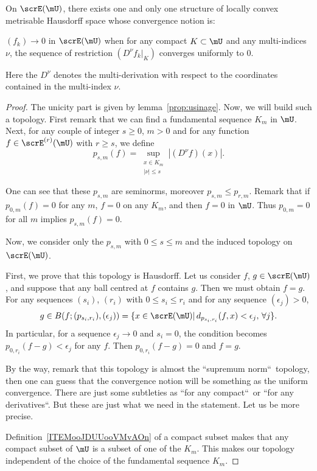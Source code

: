 \begin{proposition}
On $\scrE(\mU)$, there exists one and only one structure of locally convex metrisable Hausdorff space whose convergence notion is:

$(f_k)\to 0$ in $\scrE(\mU)$ when for any compact $K\subset\mU$ and any multi-indices $\nu$, the sequence of restriction $(D^{\nu}f_k|_K)$ converges uniformly to $0$.

Here the $D^{\nu}$ denotes the multi-derivation with respect to the coordinates contained in the multi-index $\nu$.
\label{prop:topo_E}
\end{proposition}
\begin{proof}
 The unicity part is given by lemma~\ref{prop:usinage}. Now, we will build such a topology. First remark that we can find a fundamental sequence $K_m$ in $\mU$. Next, for any couple of integer $s\geq 0$, $m>0$ and for any function $f\in\scrE^{(r)}(\mU)$ with $r\geq s$, we define
\[
   p_{s,m}(f)=\sup_{\substack{ x\in K_m\\|\nu|\leq s}}|(D^{\nu}f)(x)|.
\]

One can see that these $p_{s,m}$ are seminorms, moreover $p_{s,m}\leq p_{r,m}$. Remark that if $p_{0,m}(f)=0$ for any $m$, $f=0$ on any $K_m$, and then $f=0$ in $\mU$. Thus $p_{0,m}=0$ for all $m$ implies $p_{s,m}(f)=0$.

Now, we consider only the $p_{s,m}$ with $0\leq s\leq m$ and the induced topology on $\scrE(\mU)$.

First, we prove that this topology is Hausdorff. Let us consider $f$, $g\in\scrE(\mU)$, and suppose that any ball centred at $f$ contains $g$. Then we must obtain $f=g$. For any sequences $(s_i)$, $(r_i)$ with $0\leq s_i\leq r_i$ and for any sequence $(\epsilon_j)>0$,
\[
  g\in B(f;(p_{s_i,r_i}),(\epsilon_j))=
          \{ x\in\scrE(\mU)|\, d_{p_{s_i,r_i}}(f,x)<\epsilon_j,\,\forall j \}.
\]
In particular, for a sequence $\epsilon_j\to 0$ and $s_i=0$, the condition becomes $p_{0,r_i}(f-g)<\epsilon_j$ for any $f$. Then $p_{0,r_i}(f-g)=0$ and $f=g$.

By the way, remark that this topology is almost the ``supremum norm``\ topology, then one can guess that the convergence notion will be something as the uniform convergence. There are just some subtleties as ``for any compact``\ or ``for any derivatives``. But these are just what we need in the statement. Let us be more precise.

Definition~\ref{ITEMooJDUUooVMvAOn} of a compact subset makes that any compact subset of $\mU$ is a subset of one of the $K_m$. This makes our topology independent of the choice of the fundamental sequence $K_m$.


\end{proof}
